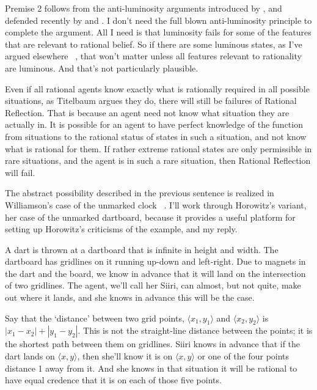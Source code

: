 Premise 2 follows from the anti-luminosity arguments introduced by \citet{Williamson2000}, and defended recently by \citet{HawthorneMagidor2009, HawthorneMagidor2011} and \citet{Srinivasan2015}. I don't need the full blown anti-luminosity principle to complete the argument. All I need is that luminosity fails for some of the features that are relevant to rational belief. So if there are some luminous states, as I've argued elsewhere ~\citep{Weatherson2004}, that won't matter unless all features relevant to rationality are luminous. And that's not particularly plausible.

Even if all rational agents know exactly what is rationally required in all possible situations, as Titelbaum argues they do, there will still be failures of Rational Reflection. That is because an agent need not know what situation they are actually in. It is possible for an agent to have perfect knowledge of the function from situations to the rational status of states in such a situation, and not know what is rational for them. If rather extreme rational states are only permissible in rare situations, and the agent is in such a rare situation, then Rational Reflection will fail.

The abstract possibility described in the previous sentence is realized in Williamson's case of the unmarked clock ~\citep{Williamson2011, Williamson2014}. I'll work through Horowitz's variant, her case of the unmarked dartboard, because it provides a useful platform for setting up Horowitz's criticisms of the example, and my reply.

A dart is thrown at a dartboard that is infinite in height and width. The dartboard has gridlines on it running up-down and left-right. Due to magnets in the dart and the board, we know in advance that it will land on the intersection of two gridlines. The agent, we'll call her \gls{Siiri}, can almost, but not quite, make out where it lands, and she knows in advance this will be the case.

Say that the `distance' between two grid points, $\langle x_1, y_1 \rangle$ and $\langle x_2, y_2 \rangle$ is $|x_1 - x_2| + |y_1 - y_2|$. This is not the straight-line distance between the points; it is the shortest path between them on gridlines. \gls{Siiri} knows in advance that if the dart lands on $\langle x, y \rangle$, then she'll know it is on $\langle x, y \rangle$ or one of the four points distance 1 away from it. And she knows in that situation it will be rational to have equal credence that it is on each of those five points.

